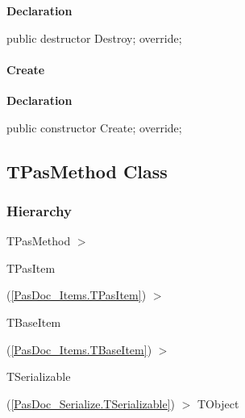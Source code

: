 \documentclass{report}
\newif\ifpdf
\begin{document}
\label{PasDoc_Items.TPasEnum-Destroy}
\begin{list}{}{
\setlength{\itemindent}{0cm}
\setlength{\listparindent}{0cm}
\setlength{\leftmargin}{\evensidemargin}
\addtolength{\leftmargin}{\tmplength}
\settowidth{\labelsep}{X}
\addtolength{\leftmargin}{\labelsep}
\setlength{\labelwidth}{\tmplength}
}
\item[\textbf{Declaration}\hfill]
\ifpdf
\begin{flushleft}
\fi
\begin{ttfamily}
public destructor Destroy; override;\end{ttfamily}

\ifpdf
\end{flushleft}
\fi

\end{list}
\paragraph*{Create}\hspace*{\fill}

\label{PasDoc_Items.TPasEnum-Create}
\begin{list}{}{
\setlength{\itemindent}{0cm}
\setlength{\listparindent}{0cm}
\setlength{\leftmargin}{\evensidemargin}
\addtolength{\leftmargin}{\tmplength}
\settowidth{\labelsep}{X}
\addtolength{\leftmargin}{\labelsep}
\setlength{\labelwidth}{\tmplength}
}
\item[\textbf{Declaration}\hfill]
\ifpdf
\begin{flushleft}
\fi
\begin{ttfamily}
public constructor Create; override;\end{ttfamily}

\ifpdf
\end{flushleft}
\fi

\end{list}
\ifpdf
\subsection*{\large{\textbf{TPasMethod Class}}\normalsize\hspace{1ex}\hrulefill}
\else
\subsection*{TPasMethod Class}
\fi
\label{PasDoc_Items.TPasMethod}
\subsubsection*{\large{\textbf{Hierarchy}}\normalsize\hspace{1ex}\hfill}
TPasMethod {$>$} \begin{ttfamily}TPasItem\end{ttfamily}(\ref{PasDoc_Items.TPasItem}) {$>$} \begin{ttfamily}TBaseItem\end{ttfamily}(\ref{PasDoc_Items.TBaseItem}) {$>$} \begin{ttfamily}TSerializable\end{ttfamily}(\ref{PasDoc_Serialize.TSerializable}) {$>$} 
TObject
\end{document}
